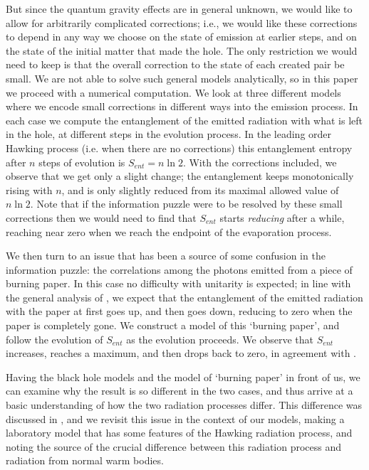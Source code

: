\documentclass[12pt]{article}
\begin{document}
But since the quantum gravity effects are in general unknown, we would like to allow for arbitrarily complicated corrections; i.e., we would like these corrections to depend in any way we choose on the state of emission at earlier steps, and on the state of the initial matter that made the hole. The only restriction we would need to keep is that the overall correction to the state of each created pair be small. We are not able to solve such general models analytically, so in this paper we proceed with a numerical computation.  We look at three different models where we encode small corrections in different ways into the emission process. In each case we compute the entanglement of the emitted radiation with what is left in the hole, at different steps in the evolution process. In the leading order Hawking process (i.e. when there are no corrections) this entanglement entropy after $n$ steps of evolution is $S_{ent}=n\ln 2$. With the corrections included, we observe that we get only a slight change;  the entanglement keeps monotonically rising with $n$, and is only slightly reduced from its maximal allowed value of $n\ln 2$. Note that if the information puzzle were to be resolved by these small corrections then we would need to find that $S_{ent}$ starts {\it reducing} after a while, reaching near zero when we reach the endpoint of the evaporation process. 


We then turn to an issue that has been a source of some confusion in the information puzzle: the correlations among the photons emitted from a piece of burning paper. In this case no difficulty with unitarity is expected; in line with the general analysis of \cite{page}, we expect that the entanglement of the emitted radiation with the paper at first goes up, and then goes down, reducing to zero when the paper is completely gone. We construct a model of this `burning paper', and follow the evolution of $S_{ent}$ as the evolution proceeds. We observe that $S_{ent}$ increases, reaches a maximum, and then drops back to zero, in agreement with \cite{page}.

Having the black hole models and the model of `burning paper' in front of us, we can examine why the result is so different in the two cases, and thus arrive at a basic understanding of how the two radiation processes differ. This difference was discussed in \cite{mathurfuzz}, and we revisit this issue in the context of our models, making a laboratory model that has some features of the Hawking radiation process, and noting the source of the crucial difference between this radiation process and radiation from normal warm bodies.  
\end{document}
